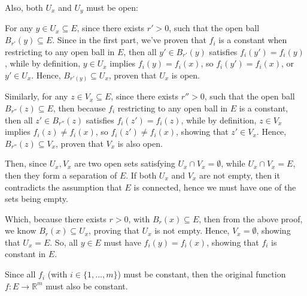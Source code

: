 \documentclass{article}
\begin{document}
Also, both $U_x$ and $U_y$ must be open: 

For any $y\in U_x\subseteq E$, since there exists $r'>0$, such that the open ball $B_{r'}(y)\subseteq E$. Since in the first part, we've proven that $f_i$ is a constant when restricting to any open ball in $E$,
then all $y'\in B_{r'}(y)$ satisfies $f_i(y')=f_i(y)$, while by definition, $y\in U_x$ implies $f_i(y)=f_i(x)$, so $f_i(y')=f_i(x)$, or $y'\in U_x$.
Hence, $B_{r'(y)}\subseteq U_x$, proven that $U_x$ is open.

Similarly, for any $z\in V_x\subseteq E$, since there exists $r''>0$, such that the open ball $B_{r''}(z)\subseteq E$, then because $f_i$ restricting to any open ball in $E$ is a constant,
then all $z'\in B_{r''}(z)$ satisfies $f_i(z')=f_i(z)$, while by definition, $z\in V_x$ implies $f_i(z)\neq f_i(x)$, so $f_i(z')\neq f_i(x)$, showing that $z'\in V_x$.
Hence, $B_{r''}(z)\subseteq V_x$, proven that $V_x$ is also open.

Then, since $U_x,V_x$ are two open sets satisfying $U_x\cap V_x = \emptyset$, while $U_x\cap V_x=E$, then they form a separation of $E$. If both $U_x$ and $V_x$ are not empty, then it contradicts the assumption that $E$ is connected,
hence we must have one of the sets being empty.

Which, because there exists $r>0$, with $B_r(x)\subseteq E$, then from the above proof, we know $B_r(x)\subseteq U_x$, proving that $U_x$ is not empty. Hence, $V_x=\emptyset$, showing that $U_x=E$.
So, all $y\in E$ must have $f_i(y)=f_i(x)$, showing that $f_i$ is constant in $E$.

\hfil

Since all $f_i$ (with $i\in \{1,...,m\}$) must be constant, then the original function $f:E\rightarrow\mathbb{R}^m$ must also be constant.

\break
\end{document}

